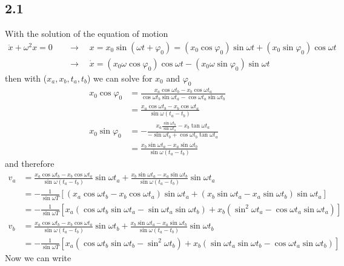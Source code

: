 \documentclass[10pt,a4paper]{book}
\theoremstyle{definition}
\begin{document}
\subsection{2.1}
With the solution of the equation of motion 
\begin{align}
    \ddot x+\omega^2x=0 &\quad\rightarrow\quad x=x_0\sin(\omega t+\varphi_0)=(x_0\cos\varphi_0)\sin \omega t+(x_0\sin\varphi_0)\cos\omega t\\
    &\quad\rightarrow\quad \dot x=(x_0\omega\cos\varphi_0)\cos \omega t-(x_0\omega\sin\varphi_0)\sin\omega t
\end{align}
then with ($x_a,x_b,t_a,t_b$) we can solve for $x_0$ and $\varphi_0$
\begin{align}
    x_0\cos\varphi_0
    &=\frac{x_a\cos\omega t_b-x_b\cos\omega t_a}{\cos\omega t_b\sin\omega t_a-\cos\omega t_a\sin\omega t_b}\\
    &=\frac{x_a\cos\omega t_b-x_b\cos\omega t_a}{\sin\omega(t_a-t_b)}\\
    x_0\sin\varphi_0&=-\frac{x_a\frac{\sin\omega t_b}{\sin\omega t_a}-x_b\tan\omega t_a}{-\sin\omega t_b+\cos\omega t_b\tan\omega t_a}\\
    &=\frac{x_b\sin\omega t_a-x_a\sin\omega t_b}{\sin\omega(t_a-t_b)}
\end{align}
and therefore
\begin{align}
    v_a&=\frac{x_a\cos\omega t_b-x_b\cos\omega t_a}{\sin\omega(t_a-t_b)}\sin\omega t_a+\frac{x_b\sin\omega t_a-x_a\sin\omega t_b}{\sin\omega(t_a-t_b)}\sin\omega t_a\\
    &=-\frac{1}{\sin\omega T}\left[(x_a\cos\omega t_b-x_b\cos\omega t_a)\sin\omega t_a+(x_b\sin\omega t_a-x_a\sin\omega t_b)\sin\omega t_a\right]\\
    &=-\frac{1}{\sin\omega T}\left[x_a(\cos\omega t_b\sin\omega t_a-\sin\omega t_a\sin\omega t_b)+x_b(\sin^2\omega t_a-\cos\omega t_a\sin\omega t_a)\right]\\
    v_b&=\frac{x_a\cos\omega t_b-x_b\cos\omega t_a}{\sin\omega(t_a-t_b)}\sin\omega t_b+\frac{x_b\sin\omega t_a-x_a\sin\omega t_b}{\sin\omega(t_a-t_b)}\sin\omega t_b\\
    &=-\frac{1}{\sin\omega T}\left[x_a(\cos\omega t_b\sin\omega t_b-\sin^2\omega t_b)+x_b(\sin\omega t_a\sin\omega t_b-\cos\omega t_a\sin\omega t_b)\right]
\end{align}
Now we can write
\end{document}
